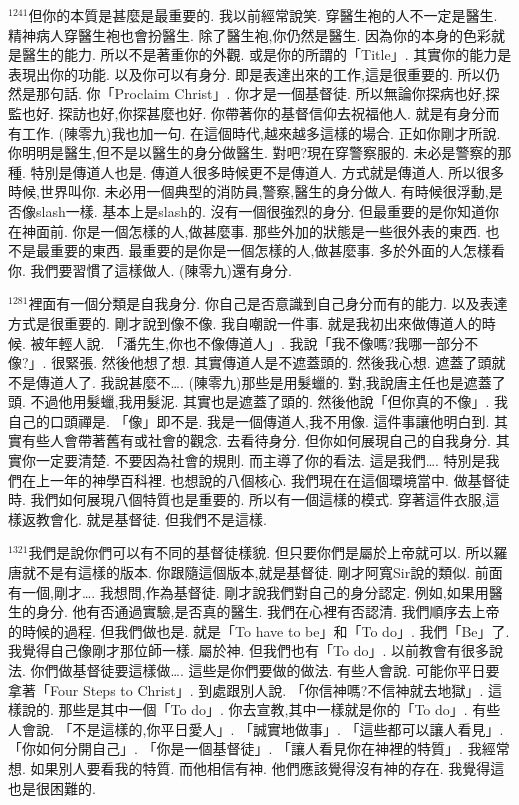 \documentclass{book}
\begin{document}
$^{1241}$但你的本質是甚麼是最重要的.
我以前經常說笑.
穿醫生袍的人不一定是醫生.
精神病人穿醫生袍也會扮醫生.
除了醫生袍,你仍然是醫生.
因為你的本身的色彩就是醫生的能力.
所以不是著重你的外觀.
或是你的所謂的「Title」.
其實你的能力是表現出你的功能.
以及你可以有身分.
即是表達出來的工作,這是很重要的.
所以仍然是那句話.
你「Proclaim Christ」.
你才是一個基督徒.
所以無論你探病也好,探監也好.
探訪也好,你探甚麼也好.
你帶著你的基督信仰去祝福他人.
就是有身分而有工作.
(陳零九)我也加一句.
在這個時代,越來越多這樣的場合.
正如你剛才所說.
你明明是醫生,但不是以醫生的身分做醫生.
對吧?現在穿警察服的.
未必是警察的那種.
特別是傳道人也是.
傳道人很多時候更不是傳道人.
方式就是傳道人.
所以很多時候,世界叫你.
未必用一個典型的消防員,警察,醫生的身分做人.
有時候很浮動,是否像slash一樣.
基本上是slash的.
沒有一個很強烈的身分.
但最重要的是你知道你在神面前.
你是一個怎樣的人,做甚麼事.
那些外加的狀態是一些很外表的東西.
也不是最重要的東西.
最重要的是你是一個怎樣的人,做甚麼事.
多於外面的人怎樣看你.
我們要習慣了這樣做人.
(陳零九)還有身分.

$^{1281}$裡面有一個分類是自我身分.
你自己是否意識到自己身分而有的能力.
以及表達方式是很重要的.
剛才說到像不像.
我自嘲說一件事.
就是我初出來做傳道人的時候.
被年輕人說.
「潘先生,你也不像傳道人」.
我說「我不像嗎?我哪一部分不像?」.
很緊張.
然後他想了想.
其實傳道人是不遮蓋頭的.
然後我心想.
遮蓋了頭就不是傳道人了.
我說甚麼不….
(陳零九)那些是用髮蠟的.
對,我說唐主任也是遮蓋了頭.
不過他用髮蠟,我用髮泥.
其實也是遮蓋了頭的.
然後他說「但你真的不像」.
我自己的口頭禪是.
「像」即不是.
我是一個傳道人,我不用像.
這件事讓他明白到.
其實有些人會帶著舊有或社會的觀念.
去看待身分.
但你如何展現自己的自我身分.
其實你一定要清楚.
不要因為社會的規則.
而主導了你的看法.
這是我們….
特別是我們在上一年的神學百科裡.
也想說的八個核心.
我們現在在這個環境當中.
做基督徒時.
我們如何展現八個特質也是重要的.
所以有一個這樣的模式.
穿著這件衣服,這樣返教會化.
就是基督徒.
但我們不是這樣.

$^{1321}$我們是說你們可以有不同的基督徒樣貌.
但只要你們是屬於上帝就可以.
所以羅唐就不是有這樣的版本.
你跟隨這個版本,就是基督徒.
剛才阿寬Sir說的類似.
前面有一個,剛才….
我想問,作為基督徒.
剛才說我們對自己的身分認定.
例如,如果用醫生的身分.
他有否通過實驗,是否真的醫生.
我們在心裡有否認清.
我們順序去上帝的時候的過程.
但我們做也是.
就是「To have to be」和「To do」.
我們「Be」了.
我覺得自己像剛才那位師一樣.
屬於神.
但我們也有「To do」.
以前教會有很多說法.
你們做基督徒要這樣做….
這些是你們要做的做法.
有些人會說.
可能你平日要拿著「Four Steps to Christ」.
到處跟別人說.
「你信神嗎?不信神就去地獄」.
這樣說的.
那些是其中一個「To do」.
你去宣教,其中一樣就是你的「To do」.
有些人會說.
「不是這樣的,你平日愛人」.
「誠實地做事」.
「這些都可以讓人看見」.
「你如何分開自己」.
「你是一個基督徒」.
「讓人看見你在神裡的特質」.
我經常想.
如果別人要看我的特質.
而他相信有神.
他們應該覺得沒有神的存在.
我覺得這也是很困難的.
\end{document}
